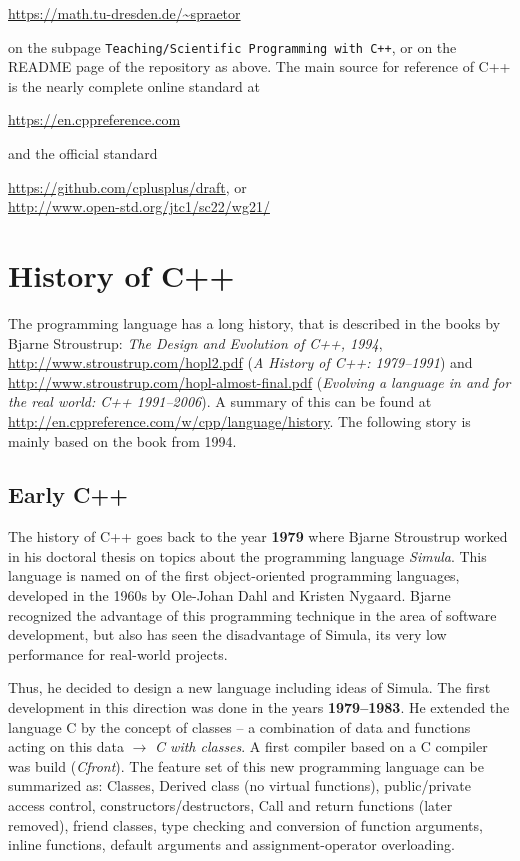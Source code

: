 \url{https://math.tu-dresden.de/~spraetor}

on the subpage \texttt{Teaching/Scientific Programming with C++}, or on the README page of the repository as above. The main source for reference of C++ is the nearly complete online standard at

\url{https://en.cppreference.com}

and the official standard

\url{https://github.com/cplusplus/draft}, or \\
\url{http://www.open-std.org/jtc1/sc22/wg21/}


\section{History of C++}
The programming language has a long history, that is described in the books by Bjarne Stroustrup: \emph{The Design and Evolution of C++, 1994},
\url{http://www.stroustrup.com/hopl2.pdf} (\emph{A History of C++: 1979--1991}) and \url{http://www.stroustrup.com/hopl-almost-final.pdf}
(\emph{Evolving a language in and for the real world: C++ 1991--2006}). A summary of this can be found at
\url{http://en.cppreference.com/w/cpp/language/history}. The following story is mainly based on the book from 1994.

\subsection{Early C++}
The history of C++ goes back to the year \textbf{1979} where Bjarne Stroustrup worked in his doctoral thesis on topics about the
programming language \emph{Simula}. This language is named on of the first object-oriented programming languages, developed in the
1960s by Ole-Johan Dahl and Kristen Nygaard. Bjarne recognized the advantage of this programming technique in the area of software
development, but also has seen the disadvantage of Simula, its very low performance for real-world projects.

Thus, he decided to design a new language including ideas of Simula. The first development in this direction was done in the years
\textbf{1979--1983}. He extended the language C by the concept of classes -- a combination of data and functions acting on this data
$\rightarrow$ \textit{C with classes}. A first compiler based on a C compiler was build (\textit{Cfront}). The feature set of this new
programming language can be summarized as: Classes, Derived class (no virtual functions), public/private access control,
constructors/destructors, Call and return functions (later removed), friend classes, type checking and conversion of function arguments,
inline functions, default arguments and assignment-operator overloading.

